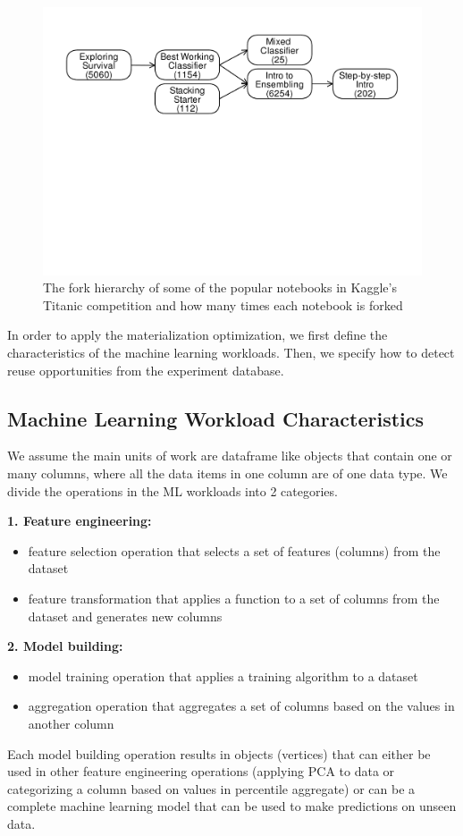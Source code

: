 \begin{figure}
\centering
\includegraphics[width=\columnwidth]{../images/kaggle-titanic-scripts-graph}
\caption{The fork hierarchy of some of the popular notebooks in Kaggle's Titanic competition and how many times each notebook is forked}
\label{fig-titanic-script-hierarchy}
\end{figure}

In order to apply the materialization optimization, we first define the characteristics of the machine learning workloads.
Then, we specify how to detect reuse opportunities from the experiment database.

\subsection{Machine Learning Workload Characteristics}
We assume the main units of work are dataframe like objects that contain one or many columns, where all the data items in one column are of one data type.
We divide the operations in the ML workloads into 2 categories.

\textbf{1. Feature engineering:}
\begin{itemize}
\item feature selection operation that selects a set of features (columns) from the dataset
\item feature transformation that applies a function to a set of columns from the dataset and generates new columns
\end{itemize}


\textbf{2. Model building: }
\begin{itemize}
\item model training operation that applies a training algorithm to a dataset
\item aggregation operation that aggregates a set of columns based on the values in another column
\end{itemize}
Each model building operation results in objects (vertices) that can either be used in other feature engineering operations (applying PCA to data or categorizing a column based on values in percentile aggregate) or can be a complete machine learning model that can be used to make predictions on unseen data.


